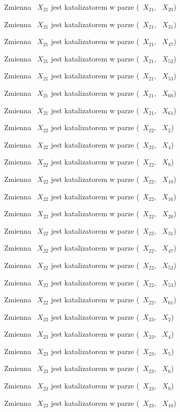 \documentclass{article}
\begin{document}
Zmienna ~$X_{21}$ jest katalizatorem w parze (~$X_{21}$, ~$X_{20}$)

Zmienna ~$X_{21}$ jest katalizatorem w parze (~$X_{21}$, ~$X_{31}$)

Zmienna ~$X_{21}$ jest katalizatorem w parze (~$X_{21}$, ~$X_{47}$)

Zmienna ~$X_{21}$ jest katalizatorem w parze (~$X_{21}$, ~$X_{52}$)

Zmienna ~$X_{21}$ jest katalizatorem w parze (~$X_{21}$, ~$X_{53}$)

Zmienna ~$X_{21}$ jest katalizatorem w parze (~$X_{21}$, ~$X_{60}$)

Zmienna ~$X_{21}$ jest katalizatorem w parze (~$X_{21}$, ~$X_{61}$)

Zmienna ~$X_{22}$ jest katalizatorem w parze (~$X_{22}$, ~$X_{2}$)

Zmienna ~$X_{22}$ jest katalizatorem w parze (~$X_{22}$, ~$X_{4}$)

Zmienna ~$X_{22}$ jest katalizatorem w parze (~$X_{22}$, ~$X_{9}$)

Zmienna ~$X_{22}$ jest katalizatorem w parze (~$X_{22}$, ~$X_{10}$)

Zmienna ~$X_{22}$ jest katalizatorem w parze (~$X_{22}$, ~$X_{16}$)

Zmienna ~$X_{22}$ jest katalizatorem w parze (~$X_{22}$, ~$X_{20}$)

Zmienna ~$X_{22}$ jest katalizatorem w parze (~$X_{22}$, ~$X_{31}$)

Zmienna ~$X_{22}$ jest katalizatorem w parze (~$X_{22}$, ~$X_{47}$)

Zmienna ~$X_{22}$ jest katalizatorem w parze (~$X_{22}$, ~$X_{52}$)

Zmienna ~$X_{22}$ jest katalizatorem w parze (~$X_{22}$, ~$X_{53}$)

Zmienna ~$X_{22}$ jest katalizatorem w parze (~$X_{22}$, ~$X_{61}$)

Zmienna ~$X_{23}$ jest katalizatorem w parze (~$X_{23}$, ~$X_{2}$)

Zmienna ~$X_{23}$ jest katalizatorem w parze (~$X_{23}$, ~$X_{4}$)

Zmienna ~$X_{23}$ jest katalizatorem w parze (~$X_{23}$, ~$X_{5}$)

Zmienna ~$X_{23}$ jest katalizatorem w parze (~$X_{23}$, ~$X_{6}$)

Zmienna ~$X_{23}$ jest katalizatorem w parze (~$X_{23}$, ~$X_{9}$)

Zmienna ~$X_{23}$ jest katalizatorem w parze (~$X_{23}$, ~$X_{10}$)
\end{document}
